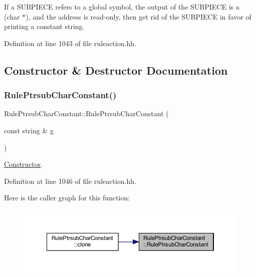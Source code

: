 If a S\+U\+B\+P\+I\+E\+CE refers to a global symbol, the output of the S\+U\+B\+P\+I\+E\+CE is a (char $\ast$), and the address is read-\/only, then get rid of the S\+U\+B\+P\+I\+E\+CE in favor of printing a constant string. 

Definition at line 1043 of file ruleaction.\+hh.



\subsection{Constructor \& Destructor Documentation}
\mbox{\label{class_rule_ptrsub_char_constant_a8a5cf4797fb0c65cfe8d23ecfab467b3}} 
\subsubsection{\texorpdfstring{RulePtrsubCharConstant()}{RulePtrsubCharConstant()}}
{\footnotesize\ttfamily Rule\+Ptrsub\+Char\+Constant\+::\+Rule\+Ptrsub\+Char\+Constant (\begin{DoxyParamCaption}\item[{const string \&}]{g }\end{DoxyParamCaption})\hspace{0.3cm}{\ttfamily [inline]}}



\mbox{\hyperlink{class_constructor}{Constructor}}. 



Definition at line 1046 of file ruleaction.\+hh.

Here is the caller graph for this function\+:
\nopagebreak
\begin{figure}[H]
\begin{center}
\leavevmode
\includegraphics[width=350pt]{class_rule_ptrsub_char_constant_a8a5cf4797fb0c65cfe8d23ecfab467b3_icgraph}
\end{center}
\end{figure}


